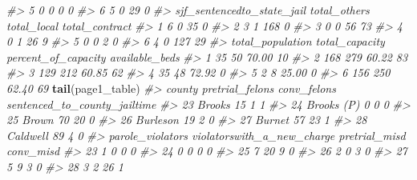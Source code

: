 \documentclass[
  12pt,
]{book}
\newenvironment{Shaded}{\begin{snugshade}}{\end{snugshade}}
\newcommand{\CommentTok}[1]{\textcolor[rgb]{0.37,0.37,0.37}{\textit{#1}}}
\newcommand{\KeywordTok}[1]{\textcolor[rgb]{0.27,0.27,0.27}{\textbf{#1}}}
\newcommand{\NormalTok}[1]{#1}
\begin{document}
\begin{Shaded}
\begin{Highlighting}[]
\CommentTok{\#> 5              0       0            0                        0}
\CommentTok{\#> 6              5       0           29                        0}
\CommentTok{\#>   sjf\_sentencedto\_state\_jail total\_others total\_local total\_contract}
\CommentTok{\#> 1                          6            0          35              0}
\CommentTok{\#> 2                          3            1         168              0}
\CommentTok{\#> 3                          0            0          56             73}
\CommentTok{\#> 4                          0            1          26              9}
\CommentTok{\#> 5                          0            0           2              0}
\CommentTok{\#> 6                          4            0         127             29}
\CommentTok{\#>   total\_population total\_capacity percent\_of\_capacity available\_beds}
\CommentTok{\#> 1               35             50               70.00             10}
\CommentTok{\#> 2              168            279               60.22             83}
\CommentTok{\#> 3              129            212               60.85             62}
\CommentTok{\#> 4               35             48               72.92              0}
\CommentTok{\#> 5                2              8               25.00              0}
\CommentTok{\#> 6              156            250               62.40             69}
\KeywordTok{tail}\NormalTok{(page1\_table)}
\CommentTok{\#>        county pretrial\_felons conv\_felons sentenced\_to\_county\_jailtime}
\CommentTok{\#> 23     Brooks              15           1                            1}
\CommentTok{\#> 24 Brooks (P)               0           0                            0}
\CommentTok{\#> 25      Brown              70          20                            0}
\CommentTok{\#> 26   Burleson              19           2                            0}
\CommentTok{\#> 27     Burnet              57          23                            1}
\CommentTok{\#> 28   Caldwell              89           4                            0}
\CommentTok{\#>    parole\_violators violatorswith\_a\_new\_charge pretrial\_misd conv\_misd}
\CommentTok{\#> 23                1                          0             0         0}
\CommentTok{\#> 24                0                          0             0         0}
\CommentTok{\#> 25                7                         20             9         0}
\CommentTok{\#> 26                2                          0             3         0}
\CommentTok{\#> 27                5                          9             3         0}
\CommentTok{\#> 28                3                          2            26         1}

\end{Highlighting}
\end{Shaded}
\end{document}

